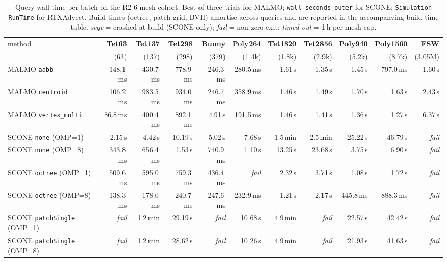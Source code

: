 \begin{table}[t]
\centering\small
\caption{Query wall time per batch on the R2-6 mesh cohort. Best of three trials for MALMO; \texttt{wall\_seconds\_outer} for SCONE; \texttt{Simulation RunTime} for RTXAdvect. Build times (octree, patch grid, BVH) amortise across queries and are reported in the accompanying build-time table. \textit{segv} = crashed at build (SCONE only); \textit{fail} = non-zero exit; \textit{timed out} = 1\,h per-mesh cap.}
\label{tab:r26-timing}
\begin{tabular}{lrrrrrrrrrr}
\toprule
method & \textbf{Tet63} & \textbf{Tet137} & \textbf{Tet298} & \textbf{Bunny} & \textbf{Poly264} & \textbf{Tet1820} & \textbf{Tet2856} & \textbf{Poly940} & \textbf{Poly1560} & \textbf{FSW} \\
 & (63) & (137) & (298) & (379) & (1.4k) & (1.8k) & (2.9k) & (5.2k) & (8.7k) & (3.05M) \\
\midrule
MALMO \texttt{aabb} & 148.1\,ms & 430.7\,ms & 778.9\,ms & 246.3\,ms & 280.5\,ms & 1.61\,s & 1.35\,s & 1.45\,s & 797.0\,ms & 1.60\,s \\
MALMO \texttt{centroid} & 106.2\,ms & 983.5\,ms & 934.0\,ms & 246.7\,ms & 358.9\,ms & 1.46\,s & 1.49\,s & 1.70\,s & 1.63\,s & 2.43\,s \\
MALMO \texttt{vertex\_multi} & 86.8\,ms & 400.4\,ms & 892.1\,ms & 4.91\,s & 191.5\,ms & 1.46\,s & 1.41\,s & 1.36\,s & 1.27\,s & 6.37\,s \\
\midrule
SCONE \texttt{none} (OMP=1) & 2.15\,s & 4.42\,s & 10.19\,s & 5.02\,s & 7.68\,s & 1.5\,min & 2.5\,min & 25.22\,s & 46.79\,s & \textit{fail} \\
SCONE \texttt{none} (OMP=8) & 343.8\,ms & 656.4\,ms & 1.53\,s & 740.9\,ms & 1.10\,s & 13.25\,s & 23.68\,s & 3.75\,s & 6.90\,s & \textit{fail} \\
SCONE \texttt{octree} (OMP=1) & 509.6\,ms & 595.0\,ms & 759.3\,ms & 436.4\,ms & \textit{fail} & 2.32\,s & 3.71\,s & 1.08\,s & 1.72\,s & \textit{fail} \\
SCONE \texttt{octree} (OMP=8) & 138.3\,ms & 178.0\,ms & 240.7\,ms & 247.6\,ms & 232.9\,ms & 1.21\,s & 2.17\,s & 445.8\,ms & 888.3\,ms & \textit{fail} \\
SCONE \texttt{patchSingle} (OMP=1) & \textit{fail} & 1.2\,min & 29.19\,s & \textit{fail} & 10.68\,s & 4.9\,min & \textit{fail} & 22.57\,s & 42.42\,s & \textit{fail} \\
SCONE \texttt{patchSingle} (OMP=8) & \textit{fail} & 1.2\,min & 28.62\,s & \textit{fail} & 10.26\,s & 4.9\,min & \textit{fail} & 21.93\,s & 41.63\,s & \textit{fail} \\

\end{tabular}
\end{table}
